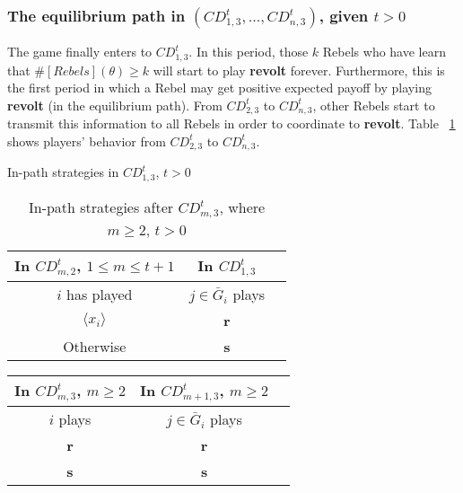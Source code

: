 \documentclass[12pt,letter]{article}
\theoremstyle{definition}
\theoremstyle{remark}
\theoremstyle{claim}
\begin{document}
\subsubsection*{The equilibrium path in $(CD^t_{1,3},...,CD^t_{n,3})$, given $t>0$}

The game finally enters to $CD^t_{1,3}$. In this period, those $k$ Rebels who have learn that $\#[Rebels](\theta)\geq k$ will start to play \textbf{revolt} forever. Furthermore, this is the first period in which a Rebel may get positive expected payoff by playing \textbf{revolt} (in the equilibrium path). From $CD^t_{2,3}$ to $CD^t_{n,3}$, other Rebels start to transmit this information to all Rebels in order to coordinate to \textbf{revolt}.  Table ~\ref{Table_stg_cdm3} shows players' behavior from $CD^t_{2,3}$ to $CD^t_{n,3}$.

\begin{table}[ht]
\caption{In-path strategies in $CD^t_{1,3}$, $t>0$}
\label{Table_stg_cd13}
\begin{center}
\begin{tabular}{c c c}
In $CD^t_{m,2}$, $1\leq m\leq t+1$ 	 	&  	In $CD^t_{1,3}$		& 	\\
\hline
\hline
$i$ has played 		  							&  $j\in \bar{G}_{i}$ plays  								& \\
\hline
$\langle x_i \rangle$ 	& 	\textbf{r}	    &  \\
Otherwise		&  \textbf{s}	&  \\

\end{tabular}
\caption{In-path strategies after $CD^t_{m,3}$, where $m\geq 2$, $t>0$}
\label{Table_stg_cdm3}
\end{center}
\end{table}

\begin{table}[ht]
\begin{center}
\begin{tabular}{c c c}
In $CD^t_{m,3}$, $m\geq 2$ 	 	&  	In $CD^t_{m+1,3}$, $m\geq 2$		& 	\\
\hline
\hline
$i$ plays 		  							&  $j\in \bar{G}_{i}$ plays  								& \\
\hline
\textbf{r} 	& 	\textbf{r}	    &  \\
\textbf{s}		&  \textbf{s}	&  \\

\end{tabular}
\end{center}
\end{table}
\end{document}
